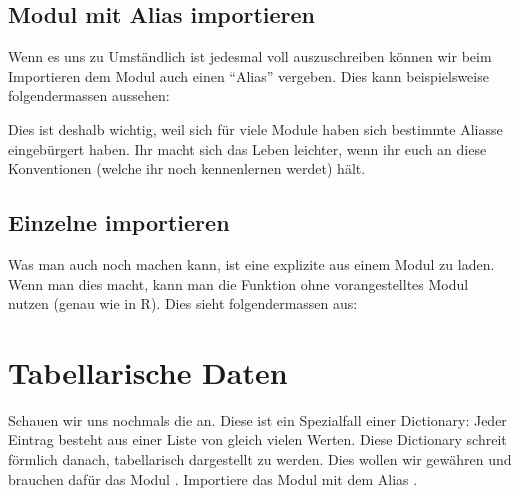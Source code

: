 \documentclass[letterpaper,10pt,english]{sphinxmanual}
\begin{document}
\section{Modul mit Alias importieren}
\label{\detokenize{01_03_Python_Module:modul-mit-alias-importieren}}
Wenn es uns zu Umständlich ist jedesmal  voll auszuschreiben können wir beim Importieren dem Modul auch einen “Alias” vergeben. Dies kann beispielsweise folgendermassen aussehen:

\begin{sphinxVerbatim}[commandchars=\\\{\}]
   
\end{sphinxVerbatim}

Dies ist deshalb wichtig, weil sich für viele Module haben sich bestimmte Aliasse eingebürgert haben. Ihr macht sich das Leben leichter, wenn ihr euch an diese Konventionen (welche ihr noch kennenlernen werdet) hält.


\section{Einzelne  importieren}
\label{\detokenize{01_03_Python_Module:einzelne-function-importieren}}
Was man auch noch machen kann, ist eine explizite  aus einem Modul zu laden. Wenn man dies macht, kann man die Funktion ohne vorangestelltes Modul nutzen (genau wie in R). Dies sieht folgendermassen aus:

\begin{sphinxVerbatim}[commandchars=\\\{\}]
   
\end{sphinxVerbatim}


\chapter{Tabellarische Daten}
\label{\detokenize{01_04_Tabellarische_Daten:tabellarische-daten}}\label{\detokenize{01_04_Tabellarische_Daten::doc}}
Schauen wir uns nochmals die   an. Diese ist ein Spezialfall einer Dictionary: Jeder Eintrag besteht aus einer Liste von gleich vielen Werten. Diese Dictionary schreit förmlich danach, tabellarisch dargestellt zu werden. Dies wollen wir gewähren und brauchen dafür das Modul . Importiere das Modul mit dem Alias .
\end{document}
